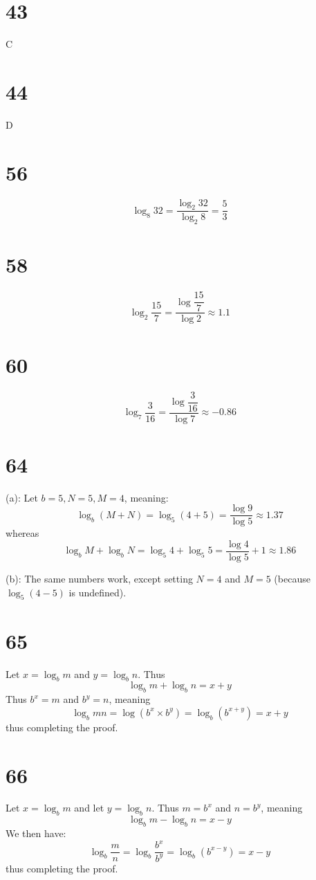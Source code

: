 \documentclass{article}
\theoremstyle{definition}
\newcommand{\?}{\stackrel{?}{=}}
\begin{document}
\section*{43}
C

\section*{44}
D

\section*{56}
\[ \log_8 32=\dfrac{\log_2 32}{\log_2 8}=\frac{5}{3} \]

\section*{58}
\[ \log_2 \frac{15}{7}=\frac{\log\dfrac{15}{7}}{\log{2}}\approx 1.1 \]

\section*{60}
\[ \log_7 \frac{3}{16}=\frac{\log\dfrac{3}{16}}{\log{7}}\approx -0.86 \]

\section*{64}
(a): Let $b=5,N=5,M=4$, meaning: \[ \log_b(M+N)=\log_5(4+5)=\frac{\log 9}{\log 5}\approx 1.37 \] whereas 
\[ \log_b M+\log_b N=\log_5 4+\log_5 5=\frac{\log 4}{\log 5}+1\approx 1.86 \]


(b): The same numbers work, except setting $N=4$ and $M=5$ (because $\log_5(4-5)$ is undefined).

\section*{65}
Let $x=\log_b m$ and $y=\log_b n$. Thus \[ \log_b m+\log_b n=x+y \] Thus $b^x=m$ and $b^y=n$, meaning 
\[ \log_b mn=\log \left( b^x\times b^y\right)=\log_b\left( b^{x+y}\right)=x+y \] thus completing the proof.

\section*{66}
Let $x=\log_b m$ and let $y=\log_b n$. Thus $m=b^x$ and $n=b^y$, meaning \[ \log_b m-\log_b n=x-y \] We then have:
\[ \log_b \frac{m}{n}=\log_b\dfrac{b^x}{b^y}=\log_b\left( b^{x-y}\right)=x-y \] thus completing the proof.
\end{document}
